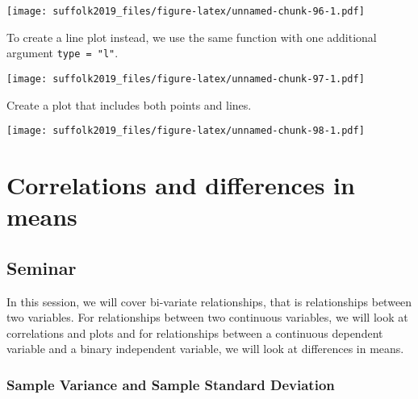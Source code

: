 \documentclass[]{article}
\newenvironment{Shaded}{\begin{snugshade}}{\end{snugshade}}
\newcommand{\DataTypeTok}[1]{\textcolor[rgb]{0.13,0.29,0.53}{#1}}
\newcommand{\KeywordTok}[1]{\textcolor[rgb]{0.13,0.29,0.53}{\textbf{#1}}}
\newcommand{\NormalTok}[1]{#1}
\newcommand{\OperatorTok}[1]{\textcolor[rgb]{0.81,0.36,0.00}{\textbf{#1}}}
\newcommand{\StringTok}[1]{\textcolor[rgb]{0.31,0.60,0.02}{#1}}
\begin{document}
\texttt{[image: suffolk2019\_files/figure-latex/unnamed-chunk-96-1.pdf]}

To create a line plot instead, we use the same function with one additional argument \texttt{type\ =\ "l"}.

\begin{Shaded}
\end{Shaded}

\texttt{[image: suffolk2019\_files/figure-latex/unnamed-chunk-97-1.pdf]}

Create a plot that includes both points and lines.

\begin{Shaded}
\end{Shaded}

\texttt{[image: suffolk2019\_files/figure-latex/unnamed-chunk-98-1.pdf]}

\hypertarget{correlations-and-differences-in-means}{%
\section{Correlations and differences in means}\label{correlations-and-differences-in-means}}

\hypertarget{seminar-6}{%
\subsection{Seminar}\label{seminar-6}}

In this session, we will cover bi-variate relationships, that is relationships between two variables. For relationships between two continuous variables, we will look at correlations and plots and for relationships between a continuous dependent variable and a binary independent variable, we will look at differences in means.

\hypertarget{sample-variance-and-sample-standard-deviation}{%
\subsubsection{Sample Variance and Sample Standard Deviation}\label{sample-variance-and-sample-standard-deviation}}
\end{document}
